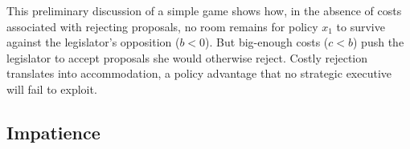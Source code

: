 \documentclass[letter,12pt]{article}
\begin{document}
This preliminary discussion of a simple game shows how, in the absence of costs associated with rejecting proposals, no room remains for policy $x_1$ to survive against the legislator's opposition ($b<0$). But big-enough costs ($c<b$) push the legislator to accept proposals she would otherwise reject. Costly rejection translates into accommodation, a policy advantage that no strategic executive will fail to exploit. 




\subsection{Impatience}

\end{document}
